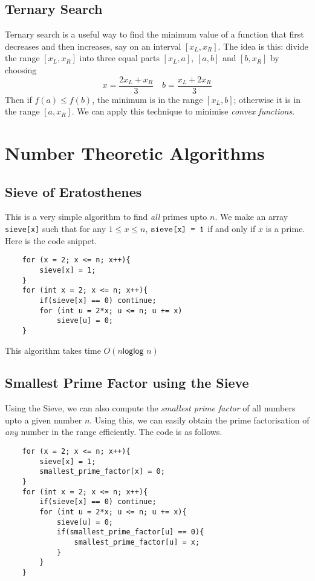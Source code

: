 \documentclass[12pt,a4paper]{amsart}
\numberwithin{equation}{section}
\theoremstyle{definition}
\begin{document}
\subsection{Ternary Search} Ternary search is a useful way to find the minimum value of a function that first decreases and then increases, say on an interval $[x_L , x_R]$. The idea is this: divide the range $[x_L , x_R]$ into three equal parts $[x_L , a]$, $[a , b]$ and $[b , x_R]$ by choosing
$$x = \dfrac{2x_L + x_R}{3}\quad b = \dfrac{x_L + 2x_R}{3}$$
Then if $f(a) \le f(b)$, the minimum is in the range $[x_L , b]$; otherwise it is in the range $[a , x_R]$. We can apply this technique to minimise \textit{convex functions}.

\section{Number Theoretic Algorithms}

\subsection{Sieve of Eratosthenes} This is a very simple algorithm to find \textit{all} primes upto $n$. We make an array \verb|sieve[x]| such that for any $1\le x\le n$, $\verb|sieve[x] = 1|$ if and only if $x$ is a prime. Here is the code snippet. 

\begin{lstlisting}
    for (x = 2; x <= n; x++){
        sieve[x] = 1;
    }
    for (int x = 2; x <= n; x++){
        if(sieve[x] == 0) continue;
        for (int u = 2*x; u <= n; u += x)
            sieve[u] = 0;
    }
\end{lstlisting}
This algorithm takes time $O(n\textsf{loglog }n)$

\subsection{Smallest Prime Factor using the Sieve} Using the Sieve, we can also compute the \textit{smallest prime factor} of all numbers upto a given number $n$. Using this, we can easily obtain the prime factorisation of \textit{any} number in the range efficiently. The code is as follows. 

\begin{lstlisting}
    for (x = 2; x <= n; x++){
        sieve[x] = 1;
        smallest_prime_factor[x] = 0;
    }
    for (int x = 2; x <= n; x++){
        if(sieve[x] == 0) continue;
        for (int u = 2*x; u <= n; u += x){
            sieve[u] = 0;
            if(smallest_prime_factor[u] == 0){
                smallest_prime_factor[u] = x;
            }
        }
    }
\end{lstlisting}
\end{document}
